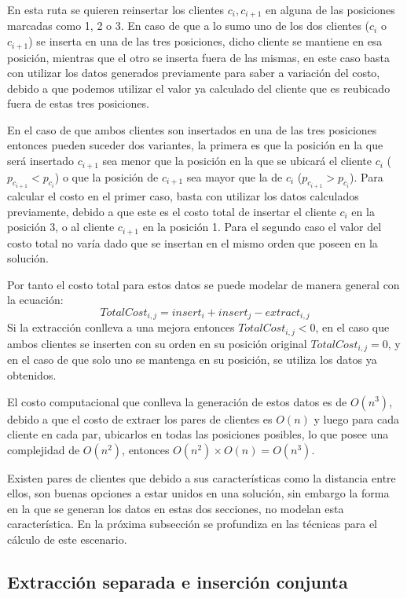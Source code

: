\documentclass{article}
\begin{document}
 
En esta ruta se quieren reinsertar los clientes $c_i,c_{i+1}$ en alguna de las posiciones marcadas como 1, 2 o 3. En caso de que a lo sumo uno de los dos clientes ($c_i$ o $c_{i+1}$) se inserta en una de las tres posiciones, dicho cliente se mantiene en esa posición, mientras que el otro se inserta fuera de las mismas, en este caso basta con utilizar los datos generados previamente para saber a variación del costo, debido a que podemos utilizar el valor ya calculado del cliente que es reubicado fuera de estas tres posiciones. 
 
En el caso de que ambos clientes son insertados en una de las tres posiciones entonces pueden suceder dos variantes, la primera es que la posición en la que será insertado $c_{i+1}$ sea menor que la posición en la que se ubicará el cliente $c_i$ ($p_{c_{i+1}} < p_{c_i}$) o que la posición de $c_{i+1}$ sea mayor que la de $c_i$ ($p_{c_{i+1}} > p_{c_i}$). Para calcular el costo en el primer caso, basta con utilizar los datos calculados previamente, debido a que este es el costo total de insertar el cliente $c_i$ en la posición 3, o al cliente $c_{i+1}$ en la posición 1. Para el segundo caso el valor del costo total no varía dado que se insertan en el mismo orden que poseen en la solución.

Por tanto el costo total para estos datos se puede modelar de manera general con la ecuación:
\[ TotalCost_{i,j} = insert_i + insert_j - extract_{i,j} \]
Si la extracción conlleva a una mejora entonces $TotalCost_{i,j} < 0$, en el caso que ambos clientes se inserten con su orden en su posición original $TotalCost_{i,j} = 0$, y en el caso de que solo uno se mantenga en su posición, se utiliza los datos ya obtenidos.

El costo computacional que conlleva la generación de estos datos es de $O(n^3)$, debido a que el costo de extraer los pares de clientes es $O(n)$ y luego para cada cliente en cada par, ubicarlos en todas las posiciones posibles, lo que posee una complejidad de $O(n^2)$, entonces $O(n^2) \times O(n) = O(n^3)$.

Existen pares de clientes que debido a sus características como la distancia entre ellos, son buenas opciones a estar unidos en una solución, sin embargo la forma en la que se generan los datos en estas dos secciones, no modelan esta característica. En la próxima subsección se profundiza en las técnicas para el cálculo de este escenario.

\subsection{Extracción separada e inserción conjunta}
\end{document}

